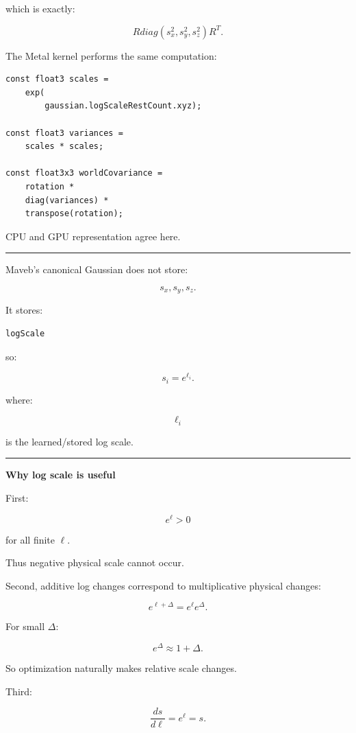 which is exactly:

\[
\boxed{
R
diag(s_x^2,s_y^2,s_z^2)
R^T.
}
\]

The Metal kernel performs the same computation:

\begin{verbatim}
const float3 scales =
    exp(
        gaussian.logScaleRestCount.xyz);

const float3 variances =
    scales * scales;

const float3x3 worldCovariance =
    rotation *
    diag(variances) *
    transpose(rotation);
\end{verbatim}

CPU and GPU representation agree here.

\begin{center}\rule{0.5\linewidth}{0.5pt}\end{center}

Maveb's canonical Gaussian does not store:

\[
s_x,s_y,s_z.
\]

It stores:

\begin{verbatim}
logScale
\end{verbatim}

so:

\[
\boxed{
s_i=e^{\ell_i}.
}
\]

where:

\[
\ell_i
\]

is the learned/stored log scale.

\begin{center}\rule{0.5\linewidth}{0.5pt}\end{center}

\textbf{Why log scale is useful}

First:

\[
e^\ell>0
\]

for all finite \(\ell\).

Thus negative physical scale cannot occur.

Second, additive log changes correspond to multiplicative physical changes:

\[
e^{\ell+\Delta}
=
e^\ell e^\Delta.
\]

For small \(\Delta\):

\[
e^\Delta
\approx
1+\Delta.
\]

So optimization naturally makes relative scale changes.

Third:

\[
\frac{ds}{d\ell}
=
e^\ell
=
s.
\]

